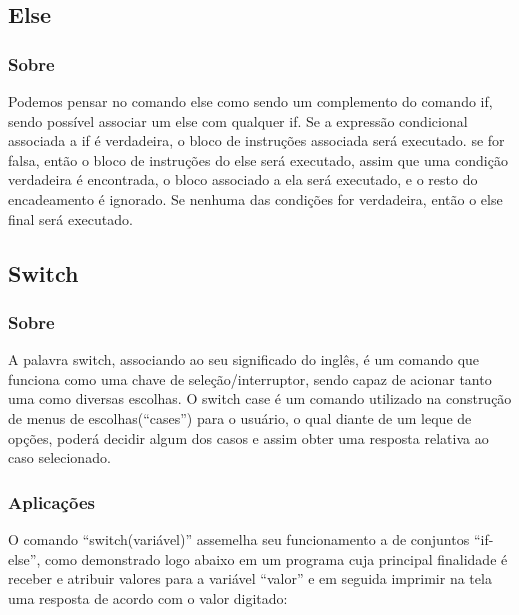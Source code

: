 \documentclass[a4paper,10pt]{article}  %
\begin{document}
 \subsection{Else}
 \subsubsection{Sobre} %

   Podemos pensar no comando else como sendo um complemento do comando if, sendo possível associar um else com qualquer if. Se a expressão condicional associada a if é verdadeira, o bloco de instruções associada será executado. \newline 
se for falsa, então o bloco de instruções do else será executado, assim que uma condição verdadeira é encontrada, o bloco associado a ela será executado, e o resto do encadeamento é ignorado. \newline 
Se nenhuma das condições for verdadeira, então o else final será executado.

  
 \subsection{Switch}
 \subsubsection{Sobre} %
    
   A palavra switch, associando ao seu significado do inglês, é um comando que funciona como uma chave de seleção/interruptor, sendo capaz de acionar tanto uma como diversas escolhas. \newline
   O switch case é um comando utilizado na construção de menus de escolhas(“cases”) para o usuário, o qual diante de um leque de opções, poderá decidir algum dos casos e assim obter uma resposta relativa ao caso selecionado.
 

  \subsubsection{Aplicações}

   O comando “switch(variável)” assemelha seu funcionamento a de conjuntos “if-else”, como demonstrado logo abaixo em um programa cuja principal finalidade é receber e atribuir valores para a variável “valor” e em seguida imprimir na tela uma resposta de acordo com o valor digitado: 
\end{document}

